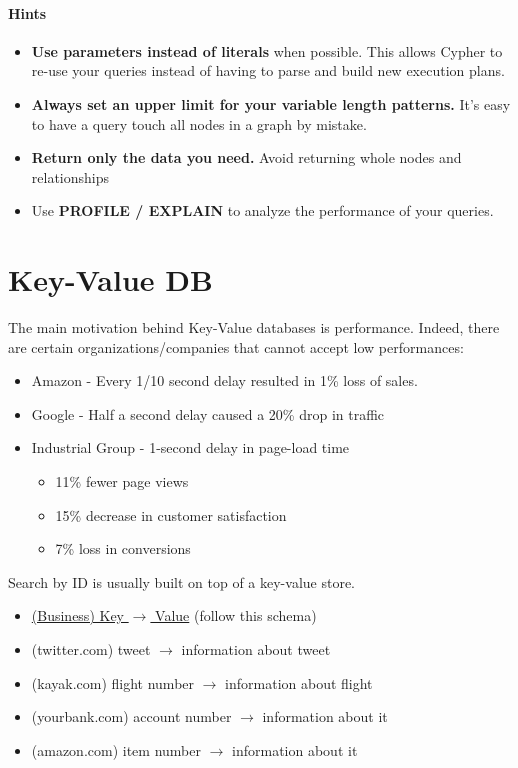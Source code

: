 \documentclass[10pt,a4paper]{article}
\begin{document}
\paragraph{Hints}
\begin{itemize}
	\item \textbf{Use parameters instead of literals} when possible. This allows Cypher to re-use your queries instead of having to parse and build new execution plans.
	\item \textbf{Always set an upper limit for your variable length patterns.} It’s easy to have a query touch all nodes in a graph by mistake.
	\item \textbf{Return only the data you need.} Avoid returning whole nodes and relationships
	\item Use \textbf{PROFILE / EXPLAIN} to analyze the performance of your queries.
\end{itemize}
\pagebreak
\section{Key-Value DB}
The main motivation behind Key-Value databases is performance. Indeed, there are certain organizations/companies that cannot accept low performances:
\begin{itemize}
	\item Amazon - Every 1/10 second delay resulted in 1\% loss of sales.
	\item Google - Half a second delay caused a 20\% drop in traffic
	\item Industrial Group - 1-second delay in page-load time
	\begin{itemize}
		\item 11\% fewer page views
		\item 15\% decrease in customer satisfaction
		\item 7\% loss in conversions
	\end{itemize}
\end{itemize}
Search by ID is usually built on top of a key-value store.
\begin{itemize}
	\item \uline{(Business) Key $\rightarrow$ Value} (follow this schema)
	\item (twitter.com) tweet $\rightarrow$ information about tweet
	\item (kayak.com) flight number $\rightarrow$ information about flight
	\item (yourbank.com) account number $\rightarrow$ information about it
	\item (amazon.com) item number $\rightarrow$ information about it
\end{itemize}
\end{document}
